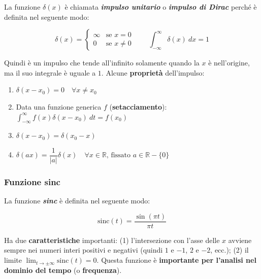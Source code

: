 \documentclass[a4paper]{article}
\begin{document}
	La funzione $\delta(x)$ è chiamata \textbf{\emph{impulso unitario}} o \textbf{\emph{impulso di Dirac}} perché è definita nel seguente modo:
	
	\begin{equation*}
		\delta(x) = 
		\begin{cases}
			\infty  & \text{se } x=0 \\
			0		& \text{se } x\ne 0
		\end{cases}
		\hspace{2em} \int_{-\infty}^{\infty} \delta(x)\: dx = 1
	\end{equation*}

	\noindent
	Quindi è un impulso che tende all'infinito solamente quando la $x$ è nell'origine, ma il suo integrale è uguale a $1$. Alcune \textbf{proprietà} dell'impulso:
	
	\begin{enumerate}
		\item $\delta(x-x_0) = 0 \hspace{1em} \forall x\ne x_0$
		\item Data una funzione generica $f$ (\textbf{setacciamento}\label{setacciamento}): $\displaystyle \int_{-\infty}^{\infty} f(x)\delta(x-x_0)\: dt = f(x_0)$
		\item $\delta(x - x_0) = \delta(x_0 - x)$
		\item $\delta(ax) = \dfrac{1}{|a|} \delta(x) \hspace{1em} \forall x \in \mathbb{R} \text{, fissato } a \in \mathbb{R}-\{0\}$
	\end{enumerate}

	\newpage
	
	\subsubsection{Funzione sinc}\label{funzione sinc}
	
	La funzione \textbf{\emph{sinc}} è definita nel seguente modo:
	
	\begin{equation*}
		\mathrm{sinc}(t) = \dfrac{\sin{\left(\pi t\right)}}{\pi t}
	\end{equation*}

	\noindent
	Ha due \textbf{caratteristiche} importanti: (1) l'intersezione con l'asse delle $x$ avviene sempre nei numeri interi positivi e negativi (quindi $1$ e $-1$, $2$ e $-2$, ecc.); (2) il limite $\displaystyle \lim_{t\rightarrow \pm\infty}\mathrm{sinc}(t) = 0$.\newline
	Questa funzione è \textbf{importante per l'analisi nel dominio del tempo} (o \textbf{frequenza}).
	
\end{document}
